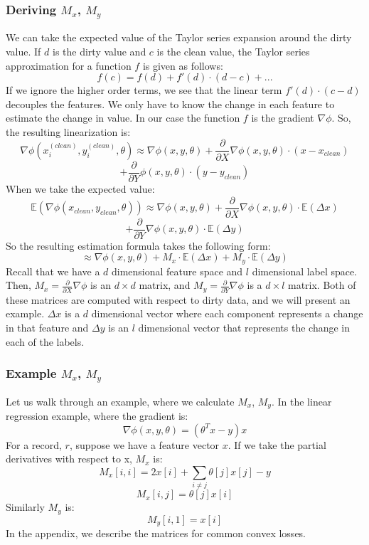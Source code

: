 \subsubsection{Deriving $M_x$, $M_y$}
We can take the expected value of the Taylor series expansion around the dirty value.
If $d$ is the dirty value and $c$ is the clean value, the Taylor series approximation for a function $f$ is given as follows:
\[
f(c) = f(d) + f'(d)\cdot(d-c) + ...
\]
If we ignore the higher order terms, we see that the linear term $f'(d)\cdot(c-d)$ decouples the features.
We only have to know the change in each feature to estimate the change in value.
In our case the function $f$ is the gradient $\nabla\phi$.
So, the resulting linearization is:
\[
\nabla\phi(x^{(clean)}_i,y^{(clean)}_i,\theta) \approx \nabla\phi(x,y,\theta) + \frac{\partial}{\partial X}\nabla\phi(x,y,\theta)\cdot (x - x_{clean}) \]
\[+ \frac{\partial}{\partial Y}\phi(x,y,\theta)\cdot (y - y_{clean})
\]
When we take the expected value:
\[
\mathbb{E}(\nabla\phi(x_{clean},y_{clean},\theta)) \approx \nabla\phi(x,y,\theta) + \frac{\partial}{\partial X}\nabla\phi(x,y,\theta)\cdot \mathbb{E}(\Delta x) \]
\[+ \frac{\partial}{\partial Y}\nabla\phi(x,y,\theta)\cdot \mathbb{E}(\Delta y)
\]
So the resulting estimation formula takes the following form:
\[
\approx \nabla\phi(x,y,\theta) + M_x \cdot \mathbb{E}(\Delta x) + M_y \cdot \mathbb{E}(\Delta y) 
\]
Recall that we have a $d$ dimensional feature space and $l$ dimensional label space.
Then, $M_x = \frac{\partial}{\partial X}\nabla\phi$ is an $d \times d$ matrix, and $M_y = \frac{\partial}{\partial Y}\nabla\phi$ is a $d \times l$ matrix.
Both of these matrices are computed with respect to dirty data, and we will present an example.
$\Delta x$ is a $d$ dimensional vector where each component represents a change in that feature and $\Delta y$ is an $l$ dimensional vector that represents the change in each of the labels. 

\subsubsection{Example $M_x$, $M_y$}
Let us walk through an example, where we calculate $M_x$, $M_y$.
In the linear regression example, where the gradient is:
\[
\nabla\phi(x,y,\theta) = (\theta^Tx - y)x
\]
For a record, $r$, suppose we have a feature vector $x$.
If we take the partial derivatives with respect to x, $M_x$ is:
\[
M_x[i,i] = 2x[i] + \sum_{i \ne j} \theta[j]x[j] - y 
\]
\[
M_x[i,j] = \theta[j]x[i]
\]
Similarly $M_y$ is:
\[
M_y[i,1] = x[i] 
\]
In the appendix, we describe the matrices for common convex losses.

